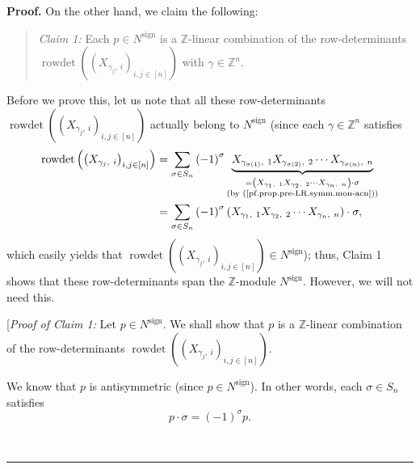 \documentclass[numbers=enddot,12pt,final,onecolumn,notitlepage,english]{scrartcl}%
\theoremstyle{definition}
\newenvironment{statement}{\begin{quote}}{\end{quote}}
\newenvironment{proof}[1][Proof]{\noindent\textbf{#1.} }{\ \rule{0.5em}{0.5em}}
\let\sumnonlimits\sum
\renewcommand{\sum}{\sumnonlimits\limits}
\begin{document}
\begin{proof}
On the other hand, we claim the following:

\begin{statement}
\textit{Claim 1:} Each $p\in N^{\operatorname*{sign}}$ is a $\mathbb{Z}%
$-linear combination of the row-determinants $\operatorname*{rowdet}\left(
\left(  X_{\gamma_{j},\ i}\right)  _{i,j\in\left[  n\right]  }\right)  $ with
$\gamma\in\mathbb{Z}^{n}$.
\end{statement}

Before we prove this, let us note that all these row-determinants
\newline$\operatorname*{rowdet}\left(  \left(  X_{\gamma_{j},\ i}\right)
_{i,j\in\left[  n\right]  }\right)  $ actually belong to
$N^{\operatorname*{sign}}$ (since each $\gamma\in\mathbb{Z}^{n}$ satisfies%
\begin{align*}
\operatorname*{rowdet}\left(  \left(  X_{\gamma_{j},\ i}\right)
_{i,j\in\left[  n\right]  }\right)   &  =\sum_{\sigma\in S_{n}}\left(
-1\right)  ^{\sigma}\underbrace{X_{\gamma_{\sigma\left(  1\right)  }%
,\ 1}X_{\gamma_{\sigma\left(  2\right)  },\ 2}\cdots X_{\gamma_{\sigma\left(
n\right)  },\ n}}_{\substack{=\left(  X_{\gamma_{1},\ 1}X_{\gamma_{2}%
,\ 2}\cdots X_{\gamma_{n},\ n}\right)  \cdot\sigma\\\text{(by
(\ref{pf.prop.pre-LR.symm.mon-acn}))}}}\\
&  =\sum_{\sigma\in S_{n}}\left(  -1\right)  ^{\sigma}\left(  X_{\gamma
_{1},\ 1}X_{\gamma_{2},\ 2}\cdots X_{\gamma_{n},\ n}\right)  \cdot\sigma,
\end{align*}
which easily yields that $\operatorname*{rowdet}\left(  \left(  X_{\gamma
_{j},\ i}\right)  _{i,j\in\left[  n\right]  }\right)  \in
N^{\operatorname*{sign}}$); thus, Claim 1 shows that these row-determinants
span the $\mathbb{Z}$-module $N^{\operatorname*{sign}}$. However, we will not
need this. \medskip

[\textit{Proof of Claim 1:} Let $p\in N^{\operatorname*{sign}}$. We shall show
that $p$ is a $\mathbb{Z}$-linear combination of the row-determinants
$\operatorname*{rowdet}\left(  \left(  X_{\gamma_{j},\ i}\right)
_{i,j\in\left[  n\right]  }\right)  $.

We know that $p$ is antisymmetric (since $p\in N^{\operatorname*{sign}}$). In
other words, each $\sigma\in S_{n}$ satisfies%
\begin{equation}
p\cdot\sigma=\left(  -1\right)  ^{\sigma}p. \label{pf.prop.pre-LR.symm.asy}%
\end{equation}



\end{proof}
\end{document}
